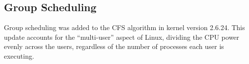 \subsection{Group Scheduling}

Group scheduling was added to the CFS algorithm in kernel version 2.6.24. This
update accounts for the ``multi-user'' aspect of Linux, dividing the CPU power
evenly across the users, regardless of the number of processes each user is
executing\cite{pabla_2009}.

